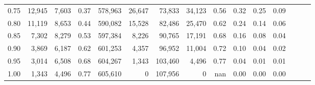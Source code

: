 \begin{tabular}{rrrrrrrrrrrrrrr}
0.75 &  12,945 &  7,603 &  0.37 &  578,963 &   26,647 &   73,833 &   34,123 &  0.56 &  0.32 &  0.25 &      0.09 \\
0.80 &  11,119 &  8,653 &  0.44 &  590,082 &   15,528 &   82,486 &   25,470 &  0.62 &  0.24 &  0.14 &      0.06 \\
0.85 &   7,302 &  8,279 &  0.53 &  597,384 &    8,226 &   90,765 &   17,191 &  0.68 &  0.16 &  0.08 &      0.04 \\
0.90 &   3,869 &  6,187 &  0.62 &  601,253 &    4,357 &   96,952 &   11,004 &  0.72 &  0.10 &  0.04 &      0.02 \\
0.95 &   3,014 &  6,508 &  0.68 &  604,267 &    1,343 &  103,460 &    4,496 &  0.77 &  0.04 &  0.01 &      0.01 \\
1.00 &   1,343 &  4,496 &  0.77 &  605,610 &        0 &  107,956 &        0 &   nan &  0.00 &  0.00 &      0.00 \\
\bottomrule
\end{tabular}
